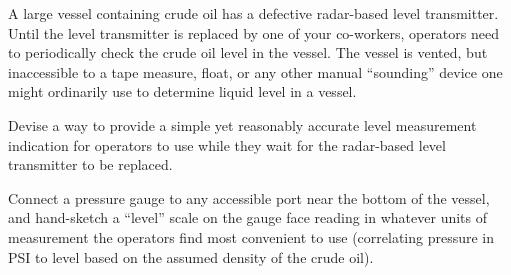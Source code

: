 

A large vessel containing crude oil has a defective radar-based level transmitter.  Until the level transmitter is replaced by one of your co-workers, operators need to periodically check the crude oil level in the vessel.  The vessel is vented, but inaccessible to a tape measure, float, or any other manual ``sounding'' device one might ordinarily use to determine liquid level in a vessel.

Devise a way to provide a simple yet reasonably accurate level measurement indication for operators to use while they wait for the radar-based level transmitter to be replaced.







Connect a pressure gauge to any accessible port near the bottom of the vessel, and hand-sketch a ``level'' scale on the gauge face reading in whatever units of measurement the operators find most convenient to use (correlating pressure in PSI to level based on the assumed density of the crude oil).
 










